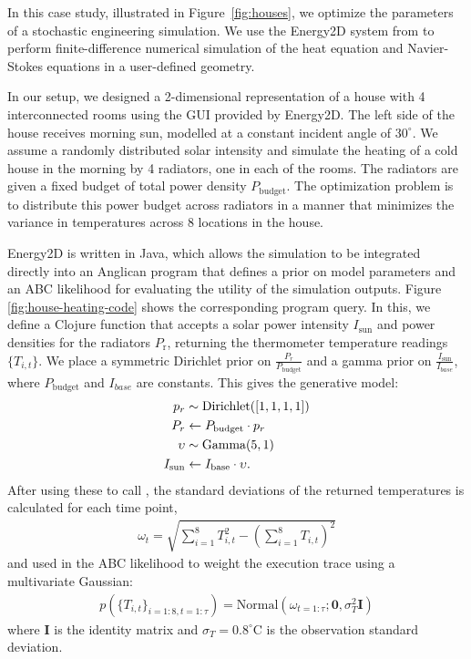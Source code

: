 
In this case study, illustrated in Figure~\ref{fig:houses}, we optimize the parameters of a stochastic engineering simulation. We use the Energy2D system from \cite{xie2012energy2d} to perform finite-difference numerical simulation of the heat equation and Navier-Stokes equations in a user-defined geometry. 

In our setup, we designed a 2-dimensional representation of a house with 4 interconnected rooms using the GUI provided by Energy2D. The left side of the house receives morning sun, modelled at a constant incident angle of $30^\circ$. We assume a randomly distributed solar intensity and simulate the heating of a cold house in the morning by 4 radiators, one in each of the rooms. The radiators are given a fixed budget of total power density $P_{\text{budget}}$. The optimization problem is to distribute this power budget across radiators in a manner that minimizes the variance in temperatures across 8 locations in the house. 

Energy2D is written in Java, which allows the simulation to be integrated directly into an Anglican program that defines a prior on model parameters and an ABC likelihood for evaluating the utility of the simulation outputs. Figure \ref{fig:house-heating-code} shows the corresponding program query. In this, we define a Clojure function  that accepts a solar power intensity $I_{\text{sun}}$ and power densities for the radiators $P_{\text{r}}$, returning the thermometer temperature readings $\{T_{i, t}\}$. We place a symmetric Dirichlet prior on $\frac{P_r}{P_{\text{budget}}}$ and a gamma prior on $\frac{I_{\text{sun}}}{I_{base}}$, where $P_{\text{budget}}$ and $I_{base}$ are constants. This gives the generative model:
 \begin{align}
 p_r &\sim \operatorname{Dirichlet}([1,1,1,1]) \\
 P_r &\leftarrow P_{\text{budget}} \cdot p_r \\
 \upsilon &\sim \text{Gamma}(5,1) \\
 I_{\text{sun}} &\leftarrow I_{\text{base}} \cdot \upsilon.
 \end{align}
After using these to call , the standard deviations of the returned temperatures is calculated for each time point,
\begin{align}
\omega_t = \sqrt{\sum_{i=1}^8 T_{i, t}^2 -\left(\sum_{i=1}^8 T_{i, t}\right)^2}
\end{align}
and used in the ABC likelihood  to weight the execution trace using a multivariate Gaussian:
\begin{align*}
p\left(\{T_{i, t}\}_{i = 1:8, t = 1:\tau}\right) = \text{Normal}\left(\omega_{t=1:\tau};\mathbf{0},\sigma_T^{2}\mathbf{I}\right)
\end{align*}
where $\mathbf{I}$ is the identity matrix and $\sigma_T = 0.8 ^{\circ} \mathrm{C}$ is the observation standard deviation.

